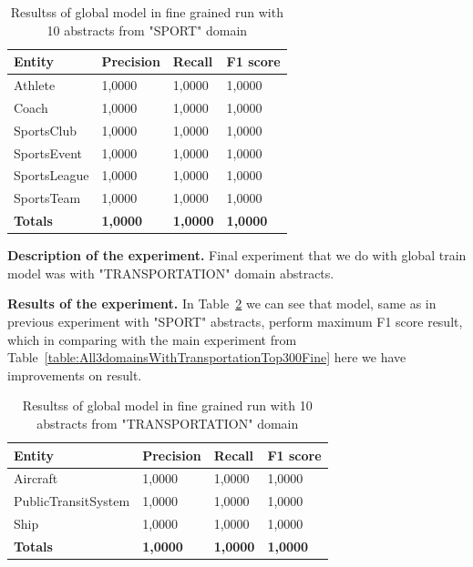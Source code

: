 \documentclass[thesis=M,english]{FITthesis}[2018/05/30]
\begin{document}
	\begin{table}[H]\centering
		\begin{tabular}{|l|l|l|l|}
			\hline {\textbf{Entity}} & {\textbf{Precision}} & {\textbf{Recall}} & {\textbf{F1 score}}\\\hline
				Athlete & 1,0000 & 1,0000 & 1,0000\\
				Coach & 1,0000 & 1,0000 & 1,0000\\
				SportsClub & 1,0000 & 1,0000 & 1,0000\\
				SportsEvent & 1,0000 & 1,0000 & 1,0000\\
				SportsLeague & 1,0000 & 1,0000 & 1,0000\\
				SportsTeam & 1,0000 & 1,0000 & 1,0000\\\hline
				\textbf{Totals} & \textbf{1,0000} & \textbf{1,0000} & \textbf{1,0000}\\\hline
		\end{tabular}
		\caption{Resultss of global model in fine grained run with 10 abstracts from "SPORT" domain \label{table:GlobalDomainWithSportTop10Fine}}		
	\end{table}
	
	\textbf{Description of the experiment.} Final experiment that we do with global train model was with "TRANSPORTATION" domain abstracts. 
	
	\textbf{Results of the experiment.} In Table~\ref{table:GlobalDomainWithTransportationTop10Fine} we can see that model, same as in previous experiment with "SPORT" abstracts, perform maximum F1 score result, which in comparing with the main experiment from Table~\ref{table:All3domainsWithTransportationTop300Fine} here we have improvements on result.
	 
	\begin{table}[H]\centering
		\begin{tabular}{|l|l|l|l|}
			\hline {\textbf{Entity}} & {\textbf{Precision}} & {\textbf{Recall}} & {\textbf{F1 score}}\\\hline
				Aircraft & 1,0000 & 1,0000 & 1,0000\\
				PublicTransitSystem & 1,0000 & 1,0000 & 1,0000\\
				Ship & 1,0000 & 1,0000 & 1,0000\\\hline
				\textbf{Totals} & \textbf{1,0000} & \textbf{1,0000} & \textbf{1,0000}\\\hline
		\end{tabular}
		\caption{Resultss of global model in fine grained run with 10 abstracts from "TRANSPORTATION" domain \label{table:GlobalDomainWithTransportationTop10Fine}}		
	\end{table}
	
\end{document}
